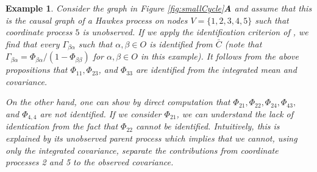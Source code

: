 \documentclass[accepted]{uai2021} %
\newtheorem{exmp}[thm]{Example}
\begin{document}
\begin{exmp}
	Consider the graph in Figure \ref{fig:smallCycle}\textbf{A} and assume that 
	this is the causal graph of a Hawkes process on nodes $V = \{1,2,3,4,5\}$ 
	such that coordinate process $5$ is unobserved. If we apply the 
	identification criterion of \cite{weihs2018}, we find that every 
	$\Gamma_{\beta\alpha}$ 
	such that 
	$\alpha,\beta\in O$ is identified from $\bar{C}$ (note that 
	$\Gamma_{\beta\alpha}={\Phi}_{\beta\alpha}/(1-{\Phi}_{\beta\beta})$ 
	for $\alpha,\beta\in O$ in this example). It 
	follows 
	from the 
	above propositions that $\Phi_{11}, \Phi_{23}$, and $\Phi_{33}$ are 
	identified from 
	the integrated mean and covariance.
	
	On the other hand, one can show by direct computation that $\Phi_{21}, 
	\Phi_{22}, 
	\Phi_{24}, 
	\Phi_{43},$ and $\Phi_{4,4}$ are not identified. If we consider 
	$\Phi_{21}$, we can 
	understand the lack of identication from the fact that $\Phi_{22}$ 
	cannot 
	be identified. 
	Intuitively, this is explained by its unobserved parent process which 
	implies that we 
	cannot, using only the integrated covariance, separate the contributions 
	from coordinate processes 2 and 5 to the observed covariance. 
\end{exmp}


\end{document}
